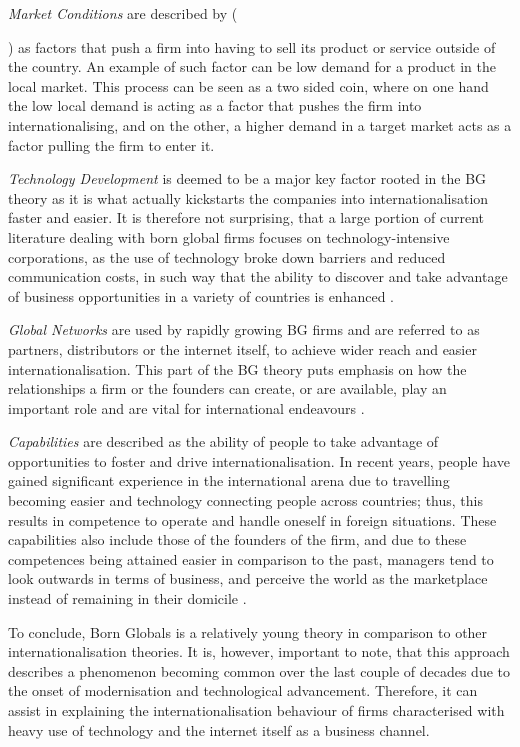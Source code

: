 \documentclass[11pt,a4paper]{article}
\begin{document}
{\textit{Market Conditions} are described by \citeauthor{madsenInternationalizationBornGlobals1997} ({\citeyear{madsenInternationalizationBornGlobals1997}) as factors that push a firm into having to sell its product or service outside of the country. An example of such factor can be low demand for a product in the local market. This process can be seen as a two sided coin, where on one hand the low local demand is acting as a factor that pushes the firm into internationalising, and on the other, a higher demand in a target market acts as a factor pulling the firm to enter it. \par
\textit{Technology Development} is deemed to be a major key factor rooted in the BG theory as it is what actually kickstarts the companies into internationalisation faster and easier. It is therefore not surprising, that a large portion of current literature dealing with born global firms focuses on technology-intensive corporations, as the use of technology broke down barriers and reduced communication costs, in such way that the ability to discover and take advantage of business opportunities in a variety of countries is enhanced \parencite{oviattTheoryInternationalNew1994, knightInternationalizationIncrementalBorn2016}. \par
\textit{Global Networks} are used by rapidly growing BG firms and are referred to as partners, distributors or the internet itself, to achieve wider reach and easier internationalisation. This part of the BG theory puts emphasis on how the relationships a firm or the founders can create, or are available, play an important role and are vital for international endeavours \parencite{fletcherInternationalEntrepreneurshipBorn2011}. \par
\textit{Capabilities} are described as the ability of people to take advantage of opportunities to foster and drive internationalisation. In recent years, people have gained significant experience in the international arena due to travelling becoming easier and technology connecting people across countries; thus, this results in competence to operate and handle oneself in foreign situations. These capabilities also include those of the founders of the firm, and due to these competences being attained easier in comparison to the past, managers tend to look outwards in terms of business, and perceive the world as the marketplace instead of remaining in their domicile \parencite{madsenInternationalizationBornGlobals1997, rialpBornglobalPhenomenonComparative2005}. \par
To conclude, Born Globals is a relatively young theory in comparison to other internationalisation theories. It is, however, important to note, that this approach describes a phenomenon becoming common over the last couple of decades due to the onset of modernisation and technological advancement. Therefore, it can assist in explaining the internationalisation behaviour of firms characterised with heavy use of technology and the internet itself as a business channel.  

}}
\end{document}
